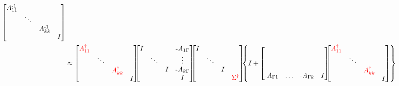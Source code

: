 \begin{figure}[h]
\begin{align}
\hspace{-.2cm}
\begin{bmatrix}
A_{11}^\varA{-1} & & & \\
& \ddots & & \\
& & A_{kk}^\varA{-1} & \\
& & & I
\end{bmatrix} \\
\label{eqn:factorization-k-subdomains-approx-five}
&\approx
\begin{bmatrix}
\textcolor{red}{A_{11}^\dagger} & & & \\
& \ddots & & \\
& & \textcolor{red}{A_{kk}^\dagger} & \\
& & & I
\end{bmatrix}
\hspace{-.2cm}
\begin{bmatrix}
I & & & \varB{-A}_{1\Gamma} \\
& \ddots & & \vdots \\
& & I & \varB{-A}_{k\Gamma} \\
& & & I
\end{bmatrix}
\hspace{-.2cm}
\begin{bmatrix}
I & & & \\
& \ddots & & \\
& & I & \\
& & & \textcolor{red}{\Sigma^\dagger}
\end{bmatrix}
\hspace{-.15cm}
\left\{
I+
\begin{bmatrix}
& & & \\
& & & \\
& & & \\
\varB{-A}_{\Gamma 1} & \ldots & \varB{-A}_{\Gamma k} & I
\end{bmatrix}
\hspace{-.2cm}
\begin{bmatrix}
\textcolor{red}{A_{11}^\dagger} & & & \\
& \ddots & & \\
& & \textcolor{red}{A_{kk}^\dagger} & \\
& & & I
\end{bmatrix}
\right\}
\end{align}
\normalsize
\end{figure}

